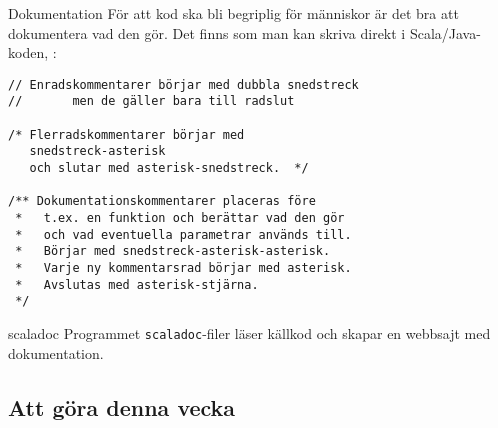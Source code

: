 \begin{Slide}{Dokumentation}\footnotesize
För att kod ska bli begriplig för människor är det bra att dokumentera vad den gör. Det finns  som man kan skriva direkt i Scala/Java-koden, :
\begin{lstlisting}
// Enradskommentarer börjar med dubbla snedstreck
//       men de gäller bara till radslut

/* Flerradskommentarer börjar med 
   snedstreck-asterisk
   och slutar med asterisk-snedstreck.  */ 

/** Dokumentationskommentarer placeras före 
 *   t.ex. en funktion och berättar vad den gör
 *   och vad eventuella parametrar används till.
 *   Börjar med snedstreck-asterisk-asterisk.
 *   Varje ny kommentarsrad börjar med asterisk.
 *   Avslutas med asterisk-stjärna.
 */
\end{lstlisting}
\end{Slide}

\begin{Slide}{scaladoc}
Programmet \texttt{scaladoc}-filer läser källkod och skapar en webbsajt med dokumentation. 

\vspace{2em}
\end{Slide}



\subsection{Att göra denna vecka}


